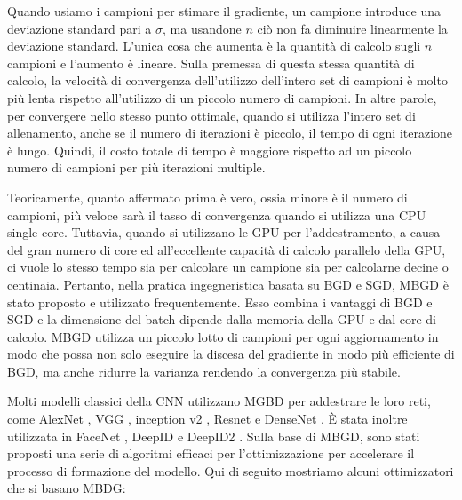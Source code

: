 Quando usiamo i campioni per stimare il gradiente, un campione introduce una deviazione standard pari a $\sigma$,
ma usandone $n$ ciò non fa diminuire linearmente la deviazione standard. L'unica cosa che aumenta è la quantità 
di calcolo sugli $n$ campioni e l'aumento è lineare. 
Sulla premessa di questa stessa quantità di calcolo, la velocità di convergenza dell'utilizzo dell'intero set di
campioni è molto più lenta rispetto all'utilizzo di un piccolo numero di campioni. In altre parole, per convergere
nello stesso punto ottimale, quando si utilizza l'intero set di allenamento, anche se il numero di iterazioni è 
piccolo, il tempo di ogni iterazione è lungo. Quindi, il costo totale di tempo è maggiore rispetto 
ad un piccolo numero di campioni per più iterazioni multiple.

Teoricamente, quanto affermato prima è vero, ossia minore è il numero di campioni, più veloce sarà il tasso 
di convergenza quando si utilizza una CPU single-core. Tuttavia, quando si utilizzano le GPU per l'addestramento, 
a causa del gran numero di core ed all'eccellente capacità di calcolo parallelo della GPU, ci vuole lo stesso 
tempo sia per calcolare un campione sia per calcolarne decine o centinaia. 
Pertanto, nella pratica ingegneristica basata su BGD e SGD, MBGD è stato proposto e utilizzato frequentemente. 
Esso combina i vantaggi di BGD e SGD e la dimensione del batch dipende dalla memoria della GPU e dal core di calcolo. 
MBGD utilizza un piccolo lotto di campioni per ogni aggiornamento in modo che possa non solo eseguire la discesa 
del gradiente in modo più efficiente di BGD, ma anche ridurre la varianza rendendo la convergenza più stabile.

Molti modelli classici della CNN utilizzano MGBD per addestrare le loro reti, come AlexNet
\cite{krizhevsky2017imagenet}, VGG \cite{simonyan2014very}, inception v2 \cite{szegedy2015going}, 
Resnet \cite{krizhevsky2017imagenet} e DenseNet \cite{huang2017densely}.
È stata inoltre utilizzata in FaceNet \cite{schroff2015facenet}, DeepID \cite{sun2014deep} e DeepID2 \cite{sun2014deeps}.
Sulla base di MBGD, sono stati proposti una serie di algoritmi efficaci per l'ottimizzazione per accelerare il 
processo di formazione del modello. Qui di seguito mostriamo alcuni ottimizzatori che si basano MBDG:

